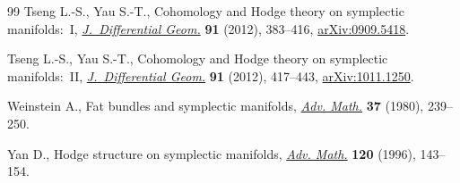 \documentclass[pdftex]{sigma}
\numberwithin{equation}{section}
\begin{document}
\begin{thebibliography}{99}
Tseng L.-S., Yau S.-T., Cohomology and {H}odge theory on symplectic
 manifolds:~{I}, \href{https://doi.org/10.4310/jdg/1349292670}{\textit{J.~Differential Geom.}} \textbf{91} (2012), 383--416,
 \href{https://arxiv.org/abs/0909.5418}{arXiv:0909.5418}.

Tseng L.-S., Yau S.-T., Cohomology and {H}odge theory on symplectic
 manifolds:~{II}, \href{https://doi.org/10.4310/jdg/1349292671}{\textit{J.~Differential Geom.}} \textbf{91} (2012), 417--443,
 \href{https://arxiv.org/abs/1011.1250}{arXiv:1011.1250}.

Weinstein A., Fat bundles and symplectic manifolds, \href{https://doi.org/10.1016/0001-8708(80)90035-3}{\textit{Adv. Math.}}
 \textbf{37} (1980), 239--250.

Yan D., Hodge structure on symplectic manifolds, \href{https://doi.org/10.1006/aima.1996.0034}{\textit{Adv. Math.}}
 \textbf{120} (1996), 143--154.

\end{thebibliography}\LastPageEnding
\end{document}
